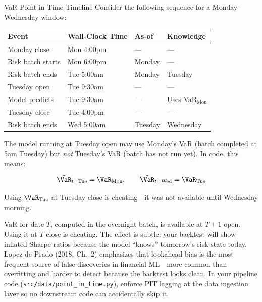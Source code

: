 \begin{workedexample}{VaR Point-in-Time Timeline}
Consider the following sequence for a Monday--Wednesday window:

\begin{center}
\small
\begin{tabular}{@{}llll@{}}
\toprule
\textbf{Event} & \textbf{Wall-Clock Time} & \textbf{As-of} & \textbf{Knowledge} \\
\midrule
Monday close       & Mon 4:00pm  & ---     & --- \\
Risk batch starts  & Mon 6:00pm  & Monday  & --- \\
Risk batch ends    & Tue 5:00am  & Monday  & Tuesday \\
Tuesday open       & Tue 9:30am  & ---     & --- \\
Model predicts     & Tue 9:30am  & ---     & Uses VaR$_{\text{Mon}}$ \\
Tuesday close      & Tue 4:00pm  & ---     & --- \\
Risk batch ends    & Wed 5:00am  & Tuesday & Wednesday \\
\bottomrule
\end{tabular}
\end{center}

The model running at Tuesday open may use Monday's VaR (batch completed
at 5am Tuesday) but \emph{not} Tuesday's VaR (batch has not run yet).
In code, this means:

\begin{equation}
\label{eq:pit-example}
\tilde{\VaR}_{t=\text{Tue}} = \VaR_{\text{Mon}}, \qquad
\tilde{\VaR}_{t=\text{Wed}} = \VaR_{\text{Tue}}
\end{equation}

Using $\VaR_{\text{Tue}}$ at Tuesday close is cheating---it was not
available until Wednesday morning.
\end{workedexample}

\begin{warning}
VaR for date $T$, computed in the overnight batch, is available at
$T+1$ open.  Using it at $T$ close is cheating.  The effect is subtle:
your backtest will show inflated Sharpe ratios because the model
``knows'' tomorrow's risk state today.  Lopez de Prado (2018, Ch.~2)
emphasizes that lookahead bias is the most frequent source of false
discoveries in financial ML---more common than overfitting and harder
to detect because the backtest looks clean.  In your pipeline code
(\texttt{src/data/point\_in\_time.py}), enforce PIT lagging at the data
ingestion layer so no downstream code can accidentally skip it.
\end{warning}

